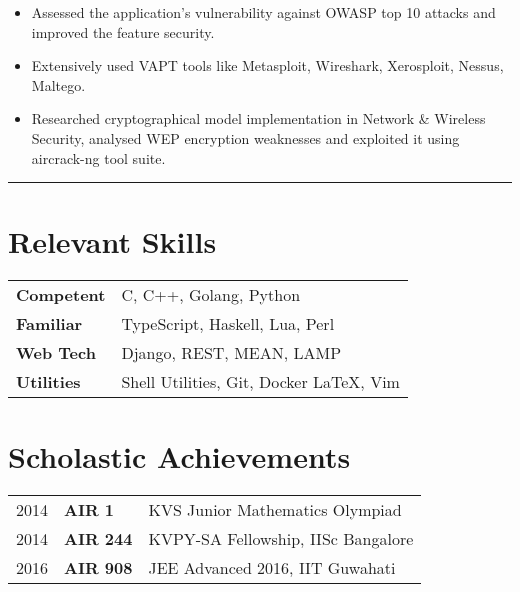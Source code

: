 \documentclass[10pt, margin=0.5in]{deedy-resume-openfont}
\begin{document}
\begin{minipage}[t]{0.48\textwidth}
\vspace{5pt}
\begin{itemize}[leftmargin=*, noitemsep]
  \item Assessed the application's vulnerability against OWASP top 10 attacks and improved the feature security.
  \item Extensively used VAPT tools like Metasploit, Wireshark, Xerosploit, Nessus, Maltego.
  \item	Researched cryptographical model implementation in Network \& Wireless Security, analysed WEP encryption weaknesses and exploited it using aircrack-ng tool suite.
\end{itemize}


\vspace{-2pt}				%
\rule{\textwidth}{0.5pt}	%
\vspace{-14pt}				%

%
%
\section{Relevant Skills}
\vspace{0pt}
\begin{tabular}{ll}
 \textbf{Competent}  & C, C++, Golang, Python \\
 \textbf{Familiar}   & TypeScript, Haskell, Lua, Perl \\
 \textbf{Web Tech}   & Django, REST, MEAN, LAMP \\
 \textbf{Utilities}  & Shell Utilities, Git, Docker \LaTeX, Vim
\end{tabular}


%
%
\section{Scholastic Achievements}
\vspace{0pt}
\begin{tabular}{lll}
  2014	   & \textbf{AIR 1}  & KVS Junior Mathematics Olympiad\\
  2014	   & \textbf{AIR 244}& KVPY-SA Fellowship, IISc Bangalore \\
  2016     & \textbf{AIR 908}& JEE Advanced 2016, IIT Guwahati \\
\end{tabular}


\end{minipage}
\end{document}
